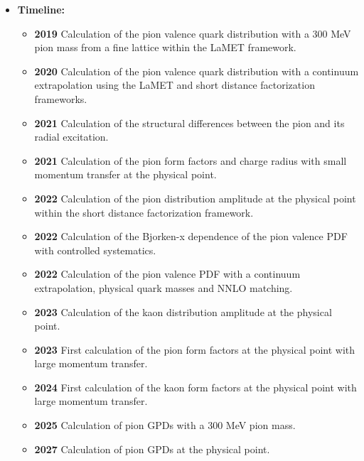 \documentclass[12pt,hyperpdf]{article}
\begin{document}
\begin{itemize}
\item{\bf Timeline:}
\begin{itemize}
    \item{\bf 2019} Calculation of the pion valence quark distribution with a 300 MeV pion mass from a fine lattice within the LaMET framework.~\cite{Izubuchi:2019lyk}
    \item{\bf 2020} Calculation of the pion valence quark distribution with a continuum extrapolation using the LaMET and short distance factorization frameworks.~\cite{Gao:2020ito}
    \item{\bf 2021} Calculation of the structural differences between the pion and its radial excitation.~\cite{Gao:2021hvs}
    \item{\bf 2021} Calculation of the pion form factors and charge radius with small momentum transfer at the physical point.~\cite{Gao:2021xsm}
    \item{\bf 2022} Calculation of the pion distribution amplitude at the physical point within the short distance factorization framework.~\cite{Gao:2022vyh}
    \item{\bf 2022} Calculation of the Bjorken-x dependence of the pion valence PDF with controlled systematics.~\cite{Gao:2021dbh}
    \item{\bf 2022} Calculation of the pion valence PDF with a continuum extrapolation, physical quark masses and NNLO matching.~\cite{Gao:2022iex}
    \item{\bf 2023} Calculation of the kaon distribution amplitude at the physical point.
    \item{\bf 2023} First calculation of the pion form factors at the physical point with large momentum transfer.
    \item{\bf 2024} First calculation of the kaon form factors at the physical point with large momentum transfer.
    \item{\bf 2025} Calculation of pion GPDs with a 300 MeV pion mass.
    \item{\bf 2027} Calculation of pion GPDs at the physical point.
\end{itemize}
\end{itemize}

    
\end{document}
